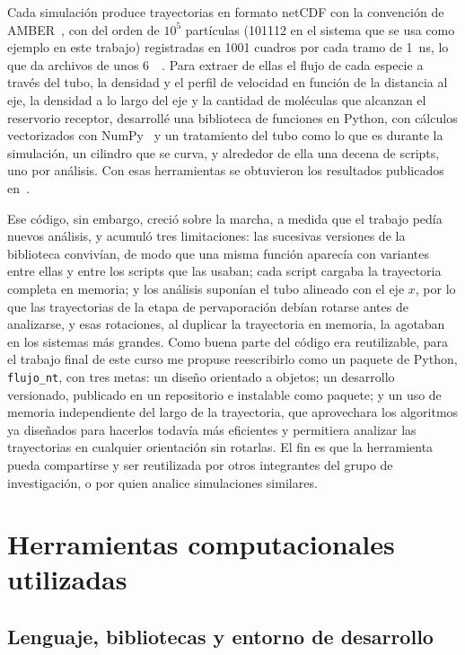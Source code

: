 \documentclass[11pt,a4paper]{article}
\newcommand{\paquete}{\texttt{flujo\_nt}}
\begin{document}
Cada simulación produce trayectorias en formato netCDF con la convención de
AMBER~\cite{amber_netcdf}, con del orden de $10^5$ partículas (\num{101112}
en el sistema que se usa como ejemplo en este trabajo) registradas en
\num{1001} cuadros por cada tramo de \SI{1}{\nano\second}, lo que da
archivos de unos \SI{6}{\giga\byte}. Para extraer de ellas el flujo de cada
especie a través del tubo, la densidad y el perfil de velocidad en función
de la distancia al eje, la densidad a lo largo del eje y la cantidad de
moléculas que alcanzan el reservorio receptor, desarrollé una biblioteca de
funciones en Python, con cálculos vectorizados con NumPy~\cite{numpy} y un
tratamiento del tubo como lo que es durante la simulación, un cilindro que
se curva, y alrededor de ella una decena de scripts, uno por análisis. Con esas
herramientas se obtuvieron los resultados publicados en~\cite{mosca2025}.

Ese código, sin embargo, creció sobre la marcha, a medida que el trabajo
pedía nuevos análisis, y acumuló tres limitaciones: las sucesivas versiones
de la biblioteca convivían, de modo que una misma función aparecía con
variantes entre ellas y entre los scripts que las usaban; cada script
cargaba la trayectoria completa en memoria; y los análisis suponían el tubo
alineado con el eje $x$, por lo que las trayectorias de la etapa de
pervaporación debían rotarse antes de analizarse, y esas rotaciones, al
duplicar la trayectoria en memoria, la agotaban en los sistemas más grandes.
Como buena parte del código era reutilizable, para el trabajo final de este
curso me propuse reescribirlo como un paquete de Python, \paquete, con tres
metas: un diseño orientado a objetos; un desarrollo versionado, publicado en un
repositorio e instalable como paquete; y un uso de memoria independiente del
largo de la trayectoria, que aprovechara los algoritmos ya diseñados para
hacerlos todavía más eficientes y permitiera analizar las trayectorias en
cualquier orientación sin rotarlas. El fin es que la herramienta pueda
compartirse y ser reutilizada por otros integrantes del grupo de
investigación, o por quien analice simulaciones similares.

\section{Herramientas computacionales utilizadas}

\subsection{Lenguaje, bibliotecas y entorno de desarrollo}
\end{document}
